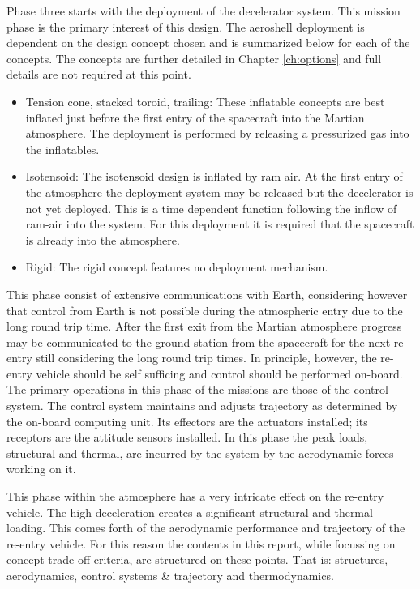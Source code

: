 Phase three starts with the deployment of the decelerator system. This mission phase is the primary interest of this design. The aeroshell deployment is dependent on the design concept chosen and is summarized below for each of the concepts. The concepts are further detailed in Chapter \ref{ch:options} and full details are not required at this point.

\begin{itemize}
\item Tension cone, stacked toroid, trailing: These inflatable concepts are best inflated just before the first entry of the spacecraft into the Martian atmosphere. The deployment is performed by releasing a pressurized gas into the inflatables.
\item Isotensoid: The isotensoid design is inflated by ram air. At the first entry of the atmosphere the deployment system may be released but the decelerator is not yet deployed. This is a time dependent function following the inflow of ram-air into the system. For this deployment it is required that the spacecraft is already into the atmosphere.
\item Rigid: The rigid concept features no deployment mechanism.
\end{itemize}
This phase consist of extensive communications with Earth, considering however that control from Earth is not possible during the atmospheric entry due to the long round trip time. After the first exit from the Martian atmosphere progress may be communicated to the ground station from the spacecraft for the next re-entry still considering the long round trip times. In principle, however, the re-entry vehicle should be self sufficing and control should be performed on-board. The primary operations in this phase of the missions are those of the control system. The control system maintains and adjusts trajectory as determined by the on-board computing unit. Its effectors are the actuators installed; its receptors are the attitude sensors installed. In this phase the peak loads, structural and thermal, are incurred by the system by the aerodynamic forces working on it.

This phase within the atmosphere has a very intricate effect on the re-entry vehicle. The high deceleration creates a significant structural and thermal loading. This comes forth of the aerodynamic performance and trajectory of the re-entry vehicle. For this reason the contents in this report, while focussing on concept trade-off criteria, are structured on these points. That is: structures, aerodynamics, control systems \& trajectory and thermodynamics.



